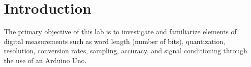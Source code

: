 \section{Introduction}

\noindent The primary objective of this lab is to investigate and familiarize elements of digital measurements such as 
word length (number of bits), quantization, resolution, conversion rates, sampling, accuracy, and signal conditioning through the use of an Arduino Uno. 


